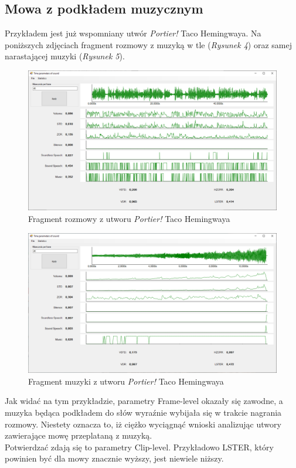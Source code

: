 \documentclass[a4paper]{article}
\begin{document}
\subsection{Mowa z podkładem muzycznym}
Przykładem jest już wspomniany utwór \textit{Portier!} Taco Hemingwaya. Na poniższych zdjęciach fragment rozmowy z muzyką w tle (\textit{Rysunek 4}) oraz samej narastającej muzyki (\textit{Rysunek 5}).
\begin{figure}[H]
  \includegraphics[width=\linewidth]{images/04speech.png}
  \caption{Fragment rozmowy z utworu \textit{Portier!} Taco Hemingwaya}
\end{figure}
\begin{figure}[H]
  \includegraphics[width=\linewidth]{images/05music.png}
  \caption{Fragment muzyki z utworu \textit{Portier!} Taco Hemingwaya}
\end{figure}
Jak widać na tym przykładzie, parametry Frame-level okazały się zawodne, a muzyka będąca podkładem do słów wyraźnie wybijała się w trakcie nagrania rozmowy. Niestety oznacza to, iż ciężko wyciągnąć wnioski analizując utwory zawierające mowę przeplataną z muzyką.\\
Potwierdzać zdają się to parametry Clip-level. Przykładowo LSTER, który powinien być dla mowy znacznie wyższy, jest niewiele niższy.
\end{document}
